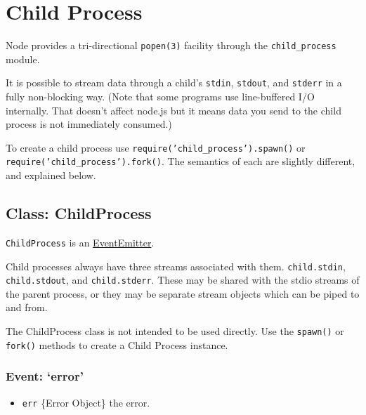 \section{Child Process}\label{child-process}

\begin{Shaded}
\begin{Highlighting}[]
 
\end{Highlighting}
\end{Shaded}

Node provides a tri-directional \texttt{popen(3)} facility through the
\texttt{child\_process} module.

It is possible to stream data through a child's \texttt{stdin},
\texttt{stdout}, and \texttt{stderr} in a fully non-blocking way. (Note
that some programs use line-buffered I/O internally. That doesn't affect
node.js but it means data you send to the child process is not
immediately consumed.)

To create a child process use \texttt{require('child\_process').spawn()}
or \texttt{require('child\_process').fork()}. The semantics of each are
slightly different, and explained below.

\subsection{Class: ChildProcess}\label{class-childprocess}

\texttt{ChildProcess} is an
\href{events.html\#events_class_events_eventemitter}{EventEmitter}.

Child processes always have three streams associated with them.
\texttt{child.stdin}, \texttt{child.stdout}, and \texttt{child.stderr}.
These may be shared with the stdio streams of the parent process, or
they may be separate stream objects which can be piped to and from.

The ChildProcess class is not intended to be used directly. Use the
\texttt{spawn()} or \texttt{fork()} methods to create a Child Process
instance.

\subsubsection{Event: `error'}\label{event-error}

\begin{itemize}
\itemsep1pt\parskip0pt
\item
  \texttt{err} \{Error Object\} the error.
\end{itemize}

